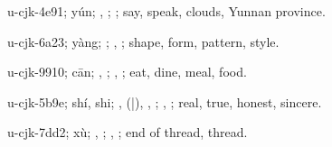 \begin{multicols}{2}
{\cjkgGlue{}u-cjk-4e91; yún; \cjkgGlue{}\cjkgGlue{}\cjkgGlue{}, \cjkgGlue{}; \cjkgGlue{}; say, speak, clouds, Yunnan province.

\cjkgGlue{}u-cjk-6a23; yàng; \cjkgGlue{}; \cjkgGlue{}, \cjkgGlue{}; shape, form, pattern, style.

\cjkgGlue{}u-cjk-9910; cān; \cjkgGlue{}\cjkgGlue{}\cjkgGlue{}, \cjkgGlue{}\cjkgGlue{}\cjkgGlue{}; \cjkgGlue{}, \cjkgGlue{}; eat, dine, meal, food.

\cjkgGlue{}u-cjk-5b9e; shí, shi; \cjkgGlue{}, \cjkgGlue{}\cjkgGlue{}(\cjkgGlue{}|\cjkgGlue{}), \cjkgGlue{}\cjkgGlue{}\cjkgGlue{}, \cjkgGlue{}\cjkgGlue{}\cjkgGlue{}; \cjkgGlue{}, \cjkgGlue{}; real, true, honest, sincere.

\cjkgGlue{}u-cjk-7dd2; xù; \cjkgGlue{}, \cjkgGlue{}; \cjkgGlue{}, \cjkgGlue{}; end of thread, thread.

}
\end{multicols}
